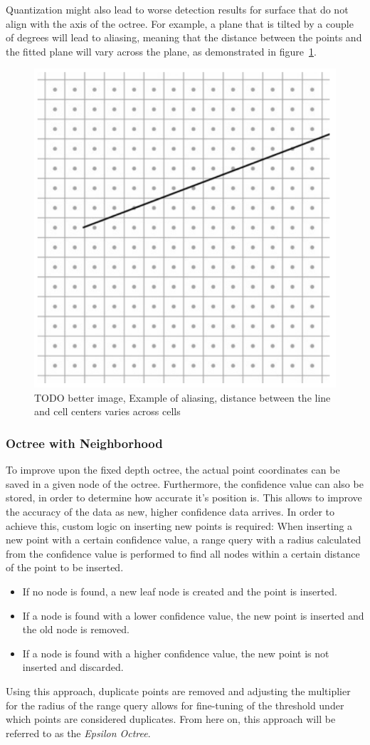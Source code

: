 Quantization might also lead to worse detection results for surface that do not align with the axis of the octree.
For example, a plane that is tilted by a couple of degrees will lead to aliasing,
meaning that the distance between the points and the fitted plane will vary across the plane, as demonstrated in figure~\ref{fig:aliasing}.
\begin{figure}[h!]
    \centering
    \includegraphics[width=0.35\linewidth]{images/aliasing}
    \caption{TODO better image, Example of aliasing, distance between the line and cell centers varies across cells}
    \label{fig:aliasing}
\end{figure}


\subsubsection{Octree with Neighborhood}

To improve upon the fixed depth octree, the actual point coordinates can be saved in a given node of the octree.
Furthermore, the confidence value can also be stored, in order to determine how accurate it's position is.
This allows to improve the accuracy of the data as new, higher confidence data arrives.
In order to achieve this, custom logic on inserting new points is required:
When inserting a new point with a certain confidence value, a range query with a radius calculated from the confidence value
is performed to find all nodes within a certain distance of the point to be inserted.
\begin{itemize}
\item If no node is found, a new leaf node is created and the point is inserted.
\item If a node is found with a lower confidence value, the new point is inserted and the old node is removed.
\item If a node is found with a higher confidence value, the new point is not inserted and discarded.
\end{itemize}
Using this approach, duplicate points are removed and adjusting the multiplier for the radius of the range query
allows for fine-tuning of the threshold under which points are considered duplicates.
From here on, this approach will be referred to as the \textit{Epsilon Octree}.

